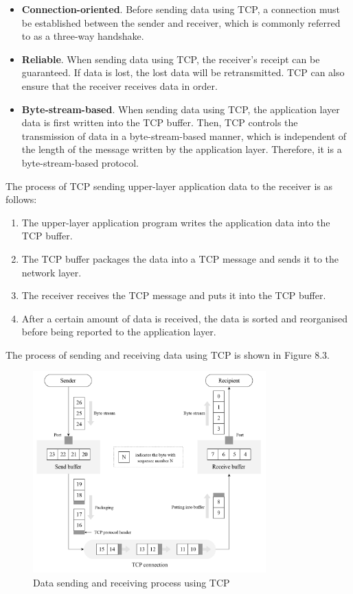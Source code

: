 \documentclass[a4paper,12pt,openany]{book}
\begin{document}
\begin{itemize}[leftmargin=1.5em]
    \item \textbf{Connection-oriented}. Before sending data using TCP, a connection must be established between the sender and receiver, which is commonly referred to as a three-way handshake.
    \item \textbf{Reliable}. When sending data using TCP, the receiver’s receipt can be guaranteed. If data is lost, the lost data will be retransmitted. TCP can also ensure that the receiver receives data in order.
    \item \textbf{Byte-stream-based}. When sending data using TCP, the application layer data is first written into the TCP buffer. Then, TCP controls the transmission of data in a byte-stream-based manner, which is independent of the length of the message written by the application layer. Therefore, it is a byte-stream-based protocol.
\end{itemize}

The process of TCP sending upper-layer application data to the receiver is as follows:

\begin{enumerate}[label=(\arabic*)]
    \item The upper-layer application program writes the application data into the TCP buffer.
    \item The TCP buffer packages the data into a TCP message and sends it to the network layer.
    \item The receiver receives the TCP message and puts it into the TCP buffer.
    \item After a certain amount of data is received, the data is sorted and reorganised before being reported to the application layer.
\end{enumerate}

The process of sending and receiving data using TCP is shown in Figure 8.3.

\begin{figure}[!h]
    \centering
    \includegraphics[width=0.8\textwidth]{D8Z/8-3}
    \caption{Data sending and receiving process using TCP}
\end{figure}
\end{document}
